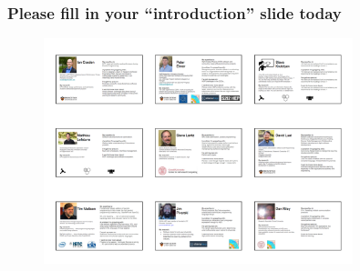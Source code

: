 \begin{frame}
\frametitle{Please fill in your ``introduction'' slide today}

\begin{figure}[htbp]
\begin{center}
\includegraphics[width=0.8\textwidth]{images/codas-hep-introduction-slides.png}
\end{center}
\end{figure}


\end{frame}


